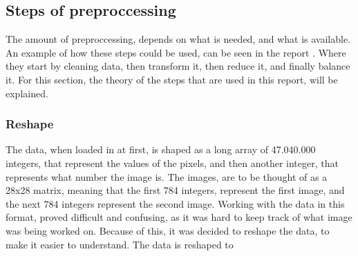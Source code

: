 \subsection{Steps of preproccessing}
The amount of preproccessing, depends on what is needed, and what is available. An example of how these steps could be used, can be seen in the report \cite{Data-preprocessing-for-flight-delays}. Where they start by cleaning data, then transform it, then reduce it, and finally balance it. For this section, the theory of the steps that are used in this report, will be explained.

\subsubsection{Reshape}
The data, when loaded in at first, is shaped as a long array of 47.040.000 integers, that represent the values of the pixels, and then another integer, that represents what number the image is. The images, are to be thought of as a 28x28 matrix, meaning that the first 784 integers, represent the first image, and the next 784 integers represent the second image. Working with the data in this format, proved difficult and confusing, as it was hard to keep track of what image was being worked on. Because of this, it was decided to reshape the data, to make it easier to understand.
The data is reshaped to 




%









